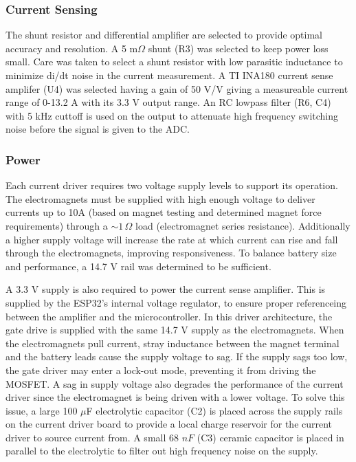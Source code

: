 \documentclass[11pt]{article}
\begin{document}
\subsubsection*{Current Sensing}
The shunt resistor and differential amplifier are selected to provide optimal accuracy and resolution. A 5 m$\Omega$ shunt (R3) was selected to keep power loss small. Care was taken to select a shunt resistor with low parasitic inductance to minimize di/dt noise in the current measurement. A TI INA180 current sense amplifer (U4) was selected having a gain of 50 V/V giving a measureable current range of 0-13.2 A with its 3.3 V output range. An RC lowpass filter (R6, C4) with 5 kHz cuttoff is used on the output to attenuate high frequency switching noise before the signal is given to the ADC.

\subsubsection*{Power}
Each current driver requires two voltage supply levels to support its operation. The electromagnets must be supplied with high enough voltage to deliver currents up to 10A (based on magnet testing and determined magnet force requirements) through a ${\sim}1\,\Omega$ load (electromagnet series resistance). Additionally a higher supply voltage will increase the rate at which current can rise and fall through the electromagnets, improving responsiveness. To balance battery size and performance, a 14.7 V rail was determined to be sufficient. 

A 3.3 V supply is also required to power the current sense amplifier. This is supplied by the ESP32's internal voltage regulator, to ensure proper referenceing between the amplifier and the microcontroller. In this driver architecture, the gate drive is supplied with the same 14.7 V supply as the electromagnets. When the electromagnets pull current, stray inductance between the magnet terminal and the battery leads cause the supply voltage to sag. If the supply sags too low, the gate driver may enter a lock-out mode, preventing it from driving the MOSFET. A sag in supply voltage also degrades the performance of the current driver since the electromagnet is being driven with a lower voltage. To solve this issue, a large 100 $\mu$F electrolytic capacitor (C2) is placed across the supply rails on the current driver board to provide a local charge reservoir for the current driver to source current from. A small 68 $nF$ (C3) ceramic capacitor is placed in parallel to the electrolytic to filter out high frequency noise on the supply.
\end{document}
